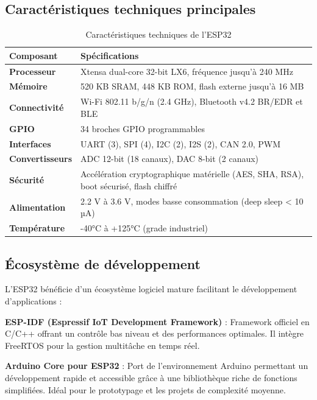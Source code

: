 \subsection{Caractéristiques techniques principales}

\begin{table}[htbp]
\centering
\small
\caption{Caractéristiques techniques de l'ESP32}
\label{tab:esp32_specs}
\begin{tabular}{|p{4cm}|p{9.5cm}|}
\hline
\rowcolor{sewesblu!20}
\textbf{Composant} & \textbf{Spécifications} \\
\hline
\textbf{Processeur} & Xtensa dual-core 32-bit LX6, fréquence jusqu'à 240 MHz \\
\hline
\textbf{Mémoire} & 520 KB SRAM, 448 KB ROM, flash externe jusqu'à 16 MB \\
\hline
\textbf{Connectivité} & Wi-Fi 802.11 b/g/n (2.4 GHz), Bluetooth v4.2 BR/EDR et BLE \\
\hline
\textbf{GPIO} & 34 broches GPIO programmables \\
\hline
\textbf{Interfaces} & UART (3), SPI (4), I2C (2), I2S (2), CAN 2.0, PWM \\
\hline
\textbf{Convertisseurs} & ADC 12-bit (18 canaux), DAC 8-bit (2 canaux) \\
\hline
\textbf{Sécurité} & Accélération cryptographique matérielle (AES, SHA, RSA), boot sécurisé, flash chiffré \\
\hline
\textbf{Alimentation} & 2.2 V à 3.6 V, modes basse consommation (deep sleep < 10 µA) \\
\hline
\textbf{Température} & -40°C à +125°C (grade industriel) \\
\hline
\end{tabular}
\end{table}


\subsection{Écosystème de développement}

L'ESP32 bénéficie d'un écosystème logiciel mature facilitant le développement d'applications :

\textbf{ESP-IDF (Espressif IoT Development Framework)} : Framework officiel en C/C++ offrant un contrôle bas niveau et des performances optimales. Il intègre FreeRTOS pour la gestion multitâche en temps réel.

\textbf{Arduino Core pour ESP32} : Port de l'environnement Arduino permettant un développement rapide et accessible grâce à une bibliothèque riche de fonctions simplifiées. Idéal pour le prototypage et les projets de complexité moyenne.

